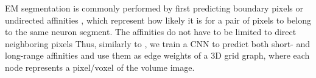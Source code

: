 EM segmentation is commonly performed by first predicting 
boundary pixels \cite{beier2017multicut,ciresan2012deep} or undirected affinities \cite{wolf2018mutex,lee2017superhuman,funke2018large}, which represent how likely it is for a pair of pixels to belong to the same neuron segment. 
The affinities do not have to be limited to direct neighboring pixels
Thus, similarly to \cite{lee2017superhuman}, we train a CNN to predict both short- and long-range affinities
and use them as edge weights of a 3D grid graph, where each node represents a pixel/voxel of the volume image. 

